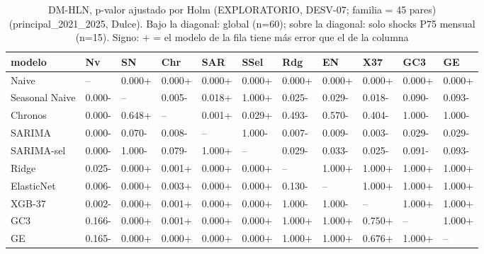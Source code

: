 \begin{table}[H]
\centering
\small
\caption{DM-HLN, p-valor ajustado por Holm (EXPLORATORIO, DESV-07; familia = 45 pares) (principal\_2021\_2025, Dulce). Bajo la diagonal: global (n=60); sobre la diagonal: solo shocks P75 mensual (n=15). Signo: + = el modelo de la fila tiene más error que el de la columna}
\label{tab:T09_DM_holm_matriz_principal_2021_2025_dulce}
\begin{tabular}{lllllllllll}
\toprule
modelo & Nv & SN & Chr & SAR & SSel & Rdg & EN & X37 & GC3 & GE \\
\midrule
Naive & -- & 0.000+ & 0.000+ & 0.000+ & 0.000+ & 0.000+ & 0.000+ & 0.000+ & 0.000+ & 0.000+ \\
Seasonal Naive & 0.000- & -- & 0.005- & 0.018+ & 1.000+ & 0.025- & 0.029- & 0.018- & 0.090- & 0.093- \\
Chronos & 0.000- & 0.648+ & -- & 0.001+ & 0.029+ & 0.493- & 0.570- & 0.404- & 1.000- & 1.000- \\
SARIMA & 0.000- & 0.070- & 0.008- & -- & 1.000- & 0.007- & 0.009- & 0.003- & 0.029- & 0.029- \\
SARIMA-sel & 0.000- & 1.000- & 0.079- & 1.000+ & -- & 0.029- & 0.033- & 0.025- & 0.091- & 0.093- \\
Ridge & 0.025- & 0.000+ & 0.001+ & 0.000+ & 0.000+ & -- & 1.000+ & 1.000+ & 1.000+ & 1.000+ \\
ElasticNet & 0.006- & 0.000+ & 0.003+ & 0.000+ & 0.000+ & 0.130- & -- & 1.000+ & 1.000+ & 1.000+ \\
XGB-37 & 0.002- & 0.000+ & 0.001+ & 0.000+ & 0.000+ & 1.000- & 1.000- & -- & 1.000+ & 1.000+ \\
GC3 & 0.166- & 0.000+ & 0.001+ & 0.000+ & 0.000+ & 1.000+ & 1.000+ & 0.750+ & -- & 1.000+ \\
GE & 0.165- & 0.000+ & 0.000+ & 0.000+ & 0.000+ & 1.000+ & 1.000+ & 0.676+ & 1.000+ & -- \\
\bottomrule
\end{tabular}
\end{table}